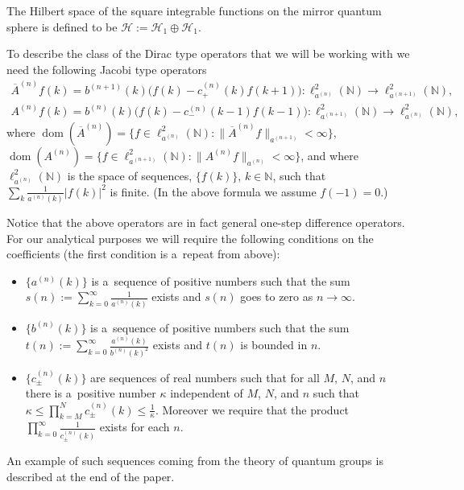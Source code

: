 \documentclass[11pt]{article}
\numberwithin{equation}{section}
\DeclareMathOperator{\dom}{dom}
\begin{document}
The Hilbert space of the square integrable functions on the mirror quantum sphere is def\/ined to be $\mathcal{H}:=
\mathcal{H}_1\oplus \mathcal{H}_1$.

To describe the class of the Dirac type operators that we will be working with we need the following Jacobi type
operators
\begin{gather*}
\overline{A}^{(n)}f(k) = b^{(n+1)}(k)\Big(f(k) - c_+^{(n)}(k)f(k+1)\Big): \ell_{a^{(n)}}^2({\mathbb N})\to
\ell_{a^{(n+1)}}^2({\mathbb N}),
\\
A^{(n)}f(k) = b^{(n)}(k)\Big(f(k) - c_-^{(n)}(k-1)f(k-1)\Big): \ell_{a^{(n+1)}}^2({\mathbb N})\to
\ell_{a^{(n)}}^2({\mathbb N}),
\end{gather*}
where $\dom(\overline{A}^{(n)}) = \{f\in \ell_{a^{(n)}}^2({\mathbb N}):
\|\overline{A}^{(n)}f\|_{a^{(n+1)}}<\infty\}$, $\dom(A^{(n)}) = \{f\in \ell_{a^{(n+1)}}^2({\mathbb N}):
\|A^{(n)}f\|_{a^{(n)}}<\infty\}$, and where $\ell_{a^{(n)}}^2({\mathbb N})$ is the space of sequences, $\{f(k)\}$,
$k\in{\mathbb N}$, such that $\sum\limits_k \frac{1}{a^{(n)}(k)}|f(k)|^2$ is f\/inite.
(In the above formula we assume $f(-1)=0$.)

Notice that the above operators are in fact general one-step dif\/ference operators.
For our analytical purposes we will require the following conditions on the coef\/f\/icients
(the f\/irst condition is a~repeat from above):
\begin{itemize}\itemsep=0pt
\item
$\{a^{(n)}(k)\}$ is a~sequence of positive numbers such that the sum $s(n):=\sum\limits_{k=0}^\infty
\frac{1}{a^{(n)}(k)}$ exists and $s(n)$ goes to zero as $n\to\infty$.

\item
$\{b^{(n)}(k)\}$ is a~sequence of positive numbers such that the sum $t(n):= \sum\limits_{k=0}^\infty
\frac{a^{(n)}(k)}{b^{(n)}(k)^2}$ exists and $t(n)$ is bounded in $n$.

\item
$\{c_{\pm}^{(n)}(k)\}$ are sequences of real numbers such that for all $M$, $N$, and $n$ there is a~positive number
$\kappa$ independent of $M$, $N$, and $n$ such that $\kappa \le \prod\limits_{k=M}^N c_{\pm}^{(n)}(k) \le
\frac{1}{\kappa}$.
Moreover we require that the product $\prod\limits_{k=0}^\infty \frac{1}{c_{\pm}^{(n)}(k)}$ exists for each $n$.
\end{itemize}

An example of such sequences coming from the theory of quantum groups is described at the end of the paper.
\end{document}
